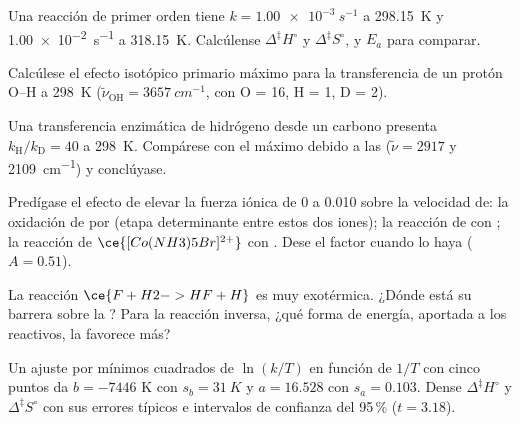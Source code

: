 \begin{exercise}[$\star\star$]\label{exo:b3:rate-theories:5}
Una reacción de primer orden tiene $k = \qty{1.00e-3}{s^{-1}}$ a \qty{298.15}{K} y \qty{1.00e-2}{s^{-1}} a
\qty{318.15}{K}. Calcúlense $\Delta^{\ddagger}H^\circ$ y $\Delta^{\ddagger}S^\circ$, y $E_a$ para comparar.
\end{exercise}

\begin{exercise}[$\star\star$]\label{exo:b3:rate-theories:6}
Calcúlese el efecto isotópico primario máximo para la transferencia de un protón O--H a
\qty{298}{K} ($\tilde\nu_{\mathrm{OH}} = \qty{3657}{cm^{-1}}$,  con O = 16, H = 1, D = 2).
\end{exercise}

\begin{exercise}[$\star\star$]\label{exo:b3:rate-theories:7}
Una transferencia enzimática de hidrógeno desde un carbono presenta $k_{\mathrm H}/k_{\mathrm D} = 40$ a \qty{298}{K}. Compárese
con el máximo debido a las  ($\tilde\nu = 2917$ y \qty{2109}{cm^{-1}}) y conclúyase.
\end{exercise}

\begin{exercise}[$\star\star$]\label{exo:b3:rate-theories:8}
Predígase el efecto de elevar la fuerza iónica de 0 a 0.010 sobre la velocidad
de: la oxidación de  por  (etapa determinante entre estos dos iones); la
reacción de  con ; la reacción de $\ce{[Co(NH3)5Br]^{2+}}$ con .
Dese el factor cuando lo haya ($A = 0.51$).
\end{exercise}

\begin{exercise}[$\star\star$]\label{exo:b3:rate-theories:9}
La reacción $\ce{F + H2 -> HF + H}$ es muy exotérmica. ¿Dónde está su barrera sobre la
? Para la reacción inversa, ¿qué forma de energía, aportada
a los reactivos, la favorece más?
\end{exercise}

\begin{exercise}[$\star\star\star$]\label{exo:b3:rate-theories:10}
Un ajuste por mínimos cuadrados de $\ln(k/T)$ en función de $1/T$ con cinco puntos da $b = -7446$ K
con $s_b = \qty{31}{K}$ y $a = 16.528$ con $s_a = 0.103$. Dense $\Delta^{\ddagger}H^\circ$ y $\Delta^{\ddagger}S^\circ$ con
sus errores típicos e intervalos de confianza del 95\,\% ($t = 3.18$).
\end{exercise}

